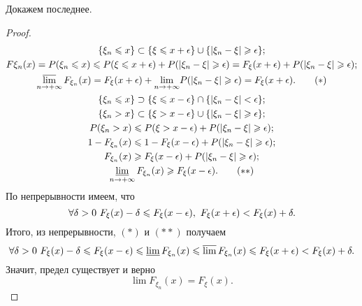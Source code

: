     Докажем последнее.
    
     \begin{proof}
     \begin{gather*}
         \{\xi_n\leqslant x\} \subset \{\xi\leqslant x+\epsilon\}\cup \{\lvert\xi_n - \xi\rvert\geqslant \epsilon\}; \\
         F\xi_n (x) = P(\xi_n\leqslant x) \leqslant P(\xi\leqslant x+\epsilon) +P(\lvert\xi_n - \xi\rvert\geqslant\epsilon) = F_\xi(x + \epsilon) + P(\lvert\xi_n - \xi\rvert\geqslant \epsilon); \\
         \varlimsup_{n\rightarrow +\infty} F_{\xi_n}(x) = F_\xi (x + \epsilon) +
             \underset{n\rightarrow +\infty}{\lim} P(\lvert\xi_n - \xi\rvert\geqslant\epsilon) = F_\xi(x+\epsilon). \label{eq:ier1}\tag{$*$}\\
        \{\xi_n \leqslant x\} \supset \{\xi\leqslant x - \epsilon\}\cap \{\lvert\xi_n - \xi\rvert< \epsilon\};\\
        \{\xi_n >x\}\subset \{\xi > x - \epsilon\} \cup \{\lvert\xi_n - \xi\rvert \geqslant\epsilon\};\\
        P(\xi_n > x) \leqslant P(\xi > x-\epsilon) + P(\lvert\xi_n - \xi\rvert\geqslant\epsilon); \\
        1 - F_{\xi_n}(x)\leqslant 1-F_\xi(x-\epsilon) +P(\lvert\xi_n - \xi\rvert\geqslant\epsilon);\\
        F_{\xi_n}(x) \geqslant F_\xi (x - \epsilon) + P(\lvert\xi_n - \xi\rvert\geqslant\epsilon);\\
        \varliminf_{n \to +\infty} F_{\xi_n}(x)  \geqslant F_\xi (x-\epsilon).\label{eq:ier2}\tag{$**$}
     \end{gather*}
        По непрерывности имеем, что
        $$\forall \delta > 0 \ F_\xi(x) - \delta \leqslant F_\xi (x - \epsilon) , \ F_\xi(x+\epsilon) < F_\xi(x) + \delta.$$
         Итого, из непрерывности,  $(*)$ и $(**)$ получаем $$\forall \delta > 0 \ F_\xi(x) - \delta \leqslant F_\xi (x - \epsilon)\leqslant
             \varliminf F_{\xi_n}(x) \leqslant \varlimsup F_{\xi_n}(x) \leqslant F_\xi(x+\epsilon) < F_\xi(x) + \delta.$$
        Значит, предел существует и верно
        $$\lim F_{\xi_n}(x) = F_\xi (x).$$
     \end{proof}